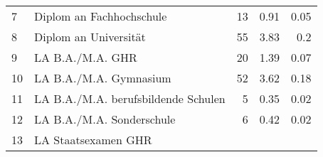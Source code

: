 \begin{longtable}{lXrrr}
     7 &
     \multicolumn{1}{X}{ Diplom an Fachhochschule   } &


       \num{13} &
       \num[round-mode=places,round-precision=2]{0.91} &
         \num[round-mode=places,round-precision=2]{0.05} \\

     8 &
     \multicolumn{1}{X}{ Diplom an Universität   } &


       \num{55} &
       \num[round-mode=places,round-precision=2]{3.83} &
         \num[round-mode=places,round-precision=2]{0.2} \\

     9 &
     \multicolumn{1}{X}{ LA B.A./M.A. GHR   } &


       \num{20} &
       \num[round-mode=places,round-precision=2]{1.39} &
         \num[round-mode=places,round-precision=2]{0.07} \\

     10 &
     \multicolumn{1}{X}{ LA B.A./M.A. Gymnasium   } &


       \num{52} &
       \num[round-mode=places,round-precision=2]{3.62} &
         \num[round-mode=places,round-precision=2]{0.18} \\

     11 &
     \multicolumn{1}{X}{ LA B.A./M.A. berufsbildende Schulen   } &


       \num{5} &
       \num[round-mode=places,round-precision=2]{0.35} &
         \num[round-mode=places,round-precision=2]{0.02} \\

     12 &
     \multicolumn{1}{X}{ LA B.A./M.A. Sonderschule   } &


       \num{6} &
       \num[round-mode=places,round-precision=2]{0.42} &
         \num[round-mode=places,round-precision=2]{0.02} \\

     13 &
     \multicolumn{1}{X}{ LA Staatsexamen GHR   } &



\end{longtable}

